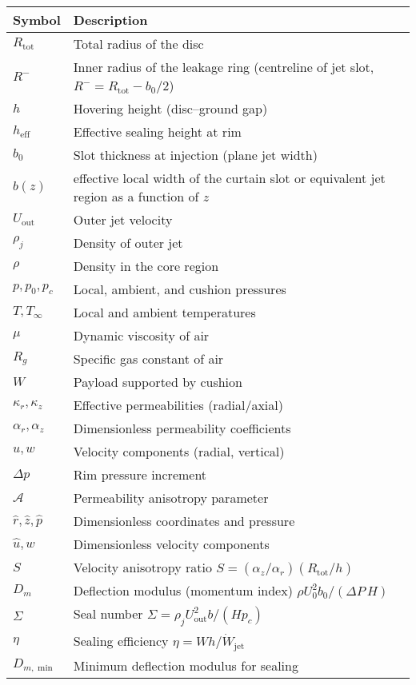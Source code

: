 \documentclass[11pt,a4paper]{article}
\begin{document}
\begin{tabular}{@{}ll@{}}
\toprule
Symbol & Description \\ \midrule
$R_{\mathrm{tot}}$ & Total radius of the disc \\
$R^{-}$ & Inner radius of the leakage ring (centreline of jet slot, $R^{-}=R_{\mathrm{tot}}-b_0/2$) \\
$h$ & Hovering height (disc--ground gap) \\
$h_{\mathrm{eff}}$ & Effective sealing height at rim \\
$b_0$ & Slot thickness at injection (plane jet width) \\
$b(z)$ & effective local width of the curtain slot or equivalent jet region as a function of $z$ \\
$U_{\mathrm{out}}$ & Outer jet velocity \\
$\rho_j$ & Density of outer jet \\
$\rho$ & Density in the core region \\
$p,p_0,p_c$ & Local, ambient, and cushion pressures \\
$T,T_\infty$ & Local and ambient temperatures \\
$\mu$ & Dynamic viscosity of air \\
$R_g$ & Specific gas constant of air \\
$W$ & Payload supported by cushion \\
$\kappa_r,\kappa_z$ & Effective permeabilities (radial/axial) \\
$\alpha_r,\alpha_z$ & Dimensionless permeability coefficients \\
$u,w$ & Velocity components (radial, vertical) \\
$\Delta p$ & Rim pressure increment \\
$\mathcal{A}$ & Permeability anisotropy parameter \\
$\hat r,\hat z,\hat p$ & Dimensionless coordinates and pressure \\
$\hat u,\hat w$ & Dimensionless velocity components \\
$S$ & Velocity anisotropy ratio $S=(\alpha_z/\alpha_r)(R_{\mathrm{tot}}/h)$ \\ $D_m$ & Deflection modulus (momentum index) $\rho U_0^2 b_0/(\Delta P\,H)$ \\
$\Sigma$ & Seal number $\Sigma=\rho_j U_{\mathrm{out}}^2 b / (H p_c)$ \\
$\eta$ & Sealing efficiency $\eta=W h/\dot W_{\mathrm{jet}}$ \\
$D_{m,\min}$ & Minimum deflection modulus for sealing \\

\end{tabular}
\end{document}
